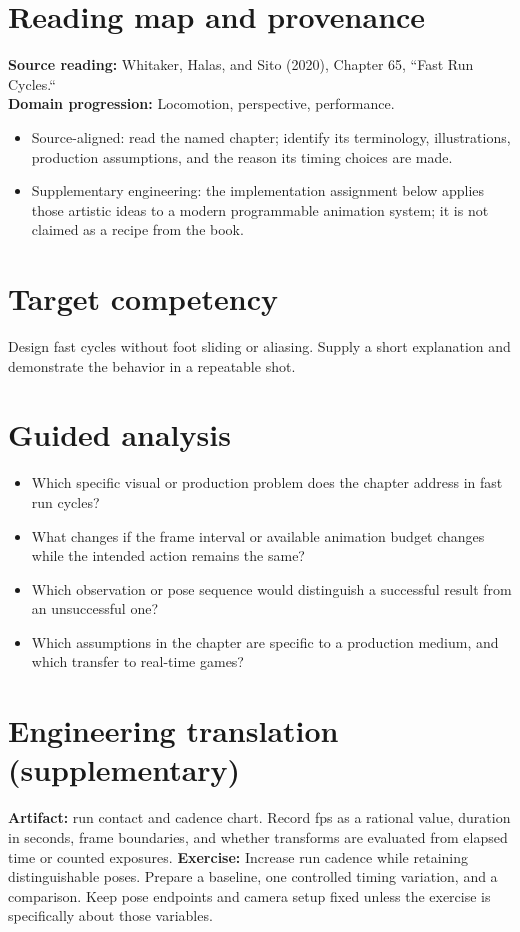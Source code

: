 \documentclass[10pt,letterpaper]{article}
\begin{document}
\makedoctitle
\makedocsummary

\section{Reading map and provenance}
\textbf{Source reading:} Whitaker, Halas, and Sito (2020), Chapter 65, ``Fast Run Cycles.``\\
\textbf{Domain progression:} Locomotion, perspective, performance.
\begin{itemize}
\item Source-aligned: read the named chapter; identify its terminology, illustrations, production assumptions, and the reason its timing choices are made.
\item Supplementary engineering: the implementation assignment below applies those artistic ideas to a modern programmable animation system; it is not claimed as a recipe from the book.
\end{itemize}
\section{Target competency}
Design fast cycles without foot sliding or aliasing. Supply a short explanation and demonstrate the behavior in a repeatable shot.
\section{Guided analysis}
\begin{itemize}
\item Which specific visual or production problem does the chapter address in fast run cycles?
\item What changes if the frame interval or available animation budget changes while the intended action remains the same?
\item Which observation or pose sequence would distinguish a successful result from an unsuccessful one?
\item Which assumptions in the chapter are specific to a production medium, and which transfer to real-time games?
\end{itemize}
\section{Engineering translation (supplementary)}
\textbf{Artifact:} run contact and cadence chart. Record fps as a rational value, duration in seconds, frame boundaries, and whether transforms are evaluated from elapsed time or counted exposures.
\textbf{Exercise:} Increase run cadence while retaining distinguishable poses. Prepare a baseline, one controlled timing variation, and a comparison. Keep pose endpoints and camera setup fixed unless the exercise is specifically about those variables.
\end{document}

